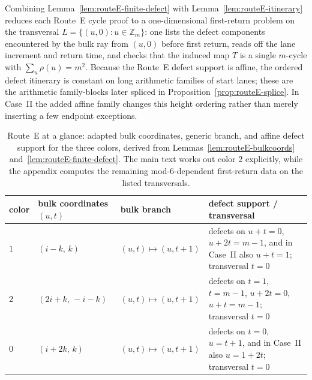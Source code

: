 \documentclass[11pt]{article}
\newcommand{\Zm}{\mathbb Z_m}
\begin{document}
Combining Lemma~\ref{lem:routeE-finite-defect} with Lemma~\ref{lem:routeE-itinerary} reduces each Route~E cycle proof to a one-dimensional first-return problem on the transversal $L=\{(u,0):u\in\Zm\}$: one lists the defect components encountered by the bulk ray from $(u,0)$ before first return, reads off the lane increment and return time, and checks that the induced map $T$ is a single $m$-cycle with $\sum_u\rho(u)=m^2$.
Because the Route~E defect support is affine, the ordered defect itinerary is constant on long arithmetic families of start lanes; these are the arithmetic family-blocks later spliced in Proposition~\ref{prop:routeE-splice}.
In Case~II the added affine family changes this height ordering rather than merely inserting a few endpoint exceptions.

\begin{table}[t]
\centering
\footnotesize
\setlength{\tabcolsep}{4pt}
\begin{tabularx}{\textwidth}{@{}l l l >{\raggedright\arraybackslash}X@{}}
\toprule
color & bulk coordinates $(u,t)$ & bulk branch & defect support / transversal \\
\midrule
$1$ & $(i-k,\,k)$ & $(u,t)\mapsto(u,t+1)$ & defects on $u+t=0$, $u+2t=m-1$, and in Case~II also $u+t=1$; transversal $t=0$ \\
$2$ & $(2i+k,\,-i-k)$ & $(u,t)\mapsto(u,t+1)$ & defects on $t=1$, $t=m-1$, $u+2t=0$, $u+t=m-1$; transversal $t=0$ \\
$0$ & $(i+2k,\,k)$ & $(u,t)\mapsto(u,t+1)$ & defects on $t=0$, $u=t+1$, and in Case~II also $u=1+2t$; transversal $t=0$ \\
\bottomrule
\end{tabularx}
\caption{Route~E at a glance: adapted bulk coordinates, generic branch, and affine defect support for the three colors, derived from Lemmas~\ref{lem:routeE-bulkcoords} and~\ref{lem:routeE-finite-defect}. The main text works out color $2$ explicitly, while the appendix computes the remaining mod-$6$-dependent first-return data on the listed transversals.}
\label{tab:routeE-summary}
\end{table}
\end{document}
